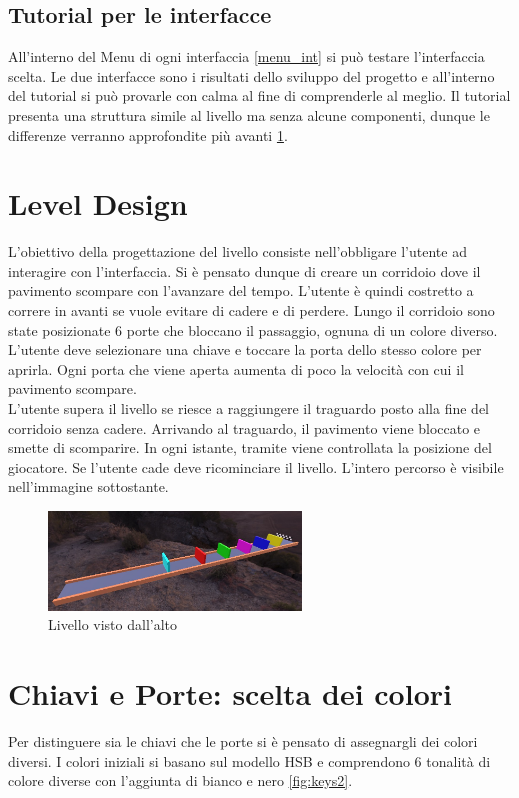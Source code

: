 \documentclass[target=bach,aauheader=]{thud}
\begin{document}
\subsection{Tutorial per le interfacce}
\label{tut_int}
All'interno del Menu di ogni interfaccia \ref{menu_int} si può testare l'interfaccia scelta.
Le due interfacce sono i risultati dello sviluppo del progetto e all'interno del tutorial si può provarle con calma al fine di comprenderle al meglio.
Il tutorial presenta una struttura simile al livello ma senza alcune componenti, dunque le differenze verranno approfondite più avanti \ref{level}. 

\section{Level Design}
\label{level}
L'obiettivo della progettazione del livello consiste nell'obbligare l'utente ad interagire con l'interfaccia.
Si è pensato dunque di creare un corridoio dove il pavimento scompare con l'avanzare del tempo.
L'utente è quindi costretto a correre in avanti se vuole evitare di cadere e di perdere.
Lungo il corridoio sono state posizionate 6 porte che bloccano il passaggio, ognuna di un colore diverso.
L'utente deve selezionare una chiave e toccare la porta dello stesso colore per aprirla.
Ogni porta che viene aperta aumenta di poco la velocità con cui il pavimento scompare. \\

L'utente supera il livello se riesce a raggiungere il traguardo posto alla fine del corridoio senza cadere.
Arrivando al traguardo, il pavimento viene bloccato e smette di scomparire.
In ogni istante, tramite viene controllata la posizione del giocatore.
Se l'utente cade deve ricominciare il livello.
L'intero percorso è visibile nell'immagine sottostante.

\begin{figure}[h]
    \centering
    \includegraphics[width=0.60\textwidth]{level}
    \caption{Livello visto dall'alto}
    \label{fig:level}
\end{figure}

\section{Chiavi e Porte: scelta dei colori}
\label{keys}
Per distinguere sia le chiavi che le porte si è pensato di assegnargli dei colori diversi.
I colori iniziali si basano sul modello HSB e comprendono 6 tonalità di colore diverse con l'aggiunta di bianco e nero \ref{fig:keys2}.
\end{document}
